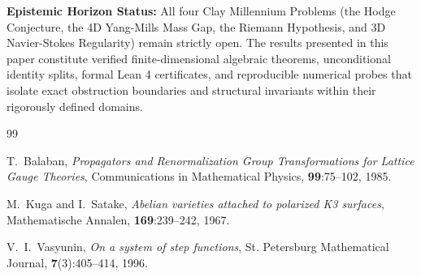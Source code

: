 \documentclass[11pt,a4paper]{article}
\theoremstyle{definition}
\begin{document}
\vspace{0.5em}
\noindent\textbf{Epistemic Horizon Status:} All four Clay Millennium Problems (the Hodge Conjecture, the 4D Yang-Mills Mass Gap, the Riemann Hypothesis, and 3D Navier-Stokes Regularity) remain strictly open. The results presented in this paper constitute verified finite-dimensional algebraic theorems, unconditional identity splits, formal Lean 4 certificates, and reproducible numerical probes that isolate exact obstruction boundaries and structural invariants within their rigorously defined domains.

\begin{thebibliography}{99}

T.~Balaban,
\textit{Propagators and Renormalization Group Transformations for Lattice Gauge Theories},
Communications in Mathematical Physics, \textbf{99}:75--102, 1985.

M.~Kuga and I.~Satake,
\textit{Abelian varieties attached to polarized K3 surfaces},
Mathematische Annalen, \textbf{169}:239--242, 1967.

V.~I.~Vasyunin,
\textit{On a system of step functions},
St. Petersburg Mathematical Journal, \textbf{7}(3):405--414, 1996.

\end{thebibliography}
\end{document}
